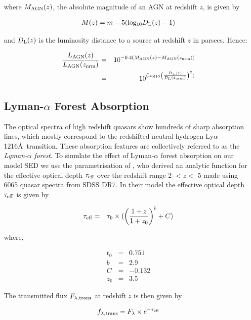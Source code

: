 where $M_{\rm AGN}(z)$, the absolute magnitude of an AGN at redshift $z$, is given by

\begin{eqnarray}
  M(z) = m - 5({\rm log_{10}}D_{\rm L}(z) - 1)
\end{eqnarray}

and $D_{\rm L}(z)$ is the luminosity distance to a source at redshift $z$ in parsecs. Hence:

\begin{eqnarray}
  \frac{L_{\rm AGN}(z)}{L_{\rm AGN}(z_{\rm nrm})} & = & 10^{-0.4(M_{\rm AGN}(z)-M_{\rm AGN}(z_{\rm nrm}))} \\
  & = & 10^{({\rm log_{10}} \left( \frac{D_{\rm L}(z)}{D_{\rm L}(z_{\rm nrm})} \right)^2 )}
\end{eqnarray}
 

\subsection{Lyman-$\alpha$ Forest Absorption}

The optical spectra of high redshift quasars show hundreds of sharp absorption lines, which mostly correspond to the redshifted neutral hydrogen Ly$\alpha$ 1216\AA~transition. These absorption features are collectively referred to as the {\it Lyman-$\alpha$ forest}. To simulate the effect of Lyman-$\alpha$ forest absorption on our model SED we use the parametrisation of \citet{becker13}, who derived an analytic function for the effective optical depth $\tau_{\rm eff}$ over the redshift range 2 $< z <$ 5 made using 6065 quasar spectra from SDSS DR7. In their model the effective optical depth $\tau_{\rm eff}$ is given by 

\begin{eqnarray}
  \label{eq:taueff}
  \tau_{\rm eff} & = & \tau_0 \times ( \left( \frac{ 1 + z }{ 1 + z_0 } \right)^b + C )
\end{eqnarray}

where,

\begin{eqnarray*}
  t_0 & = & 0.751 \\
  b & = & 2.9 \\
  C & = & -0.132 \\
  z_0 & = & 3.5 
\end{eqnarray*}

The transmitted flux $F_{\lambda,{\rm trans}}$ at redshift $z$ is then given by 

\begin{eqnarray}
  \label{eq:ftrans}
  f_{\lambda,{\rm trans}} = F_\lambda \times e^{ -\tau_{\rm eff} }
\end{eqnarray}

